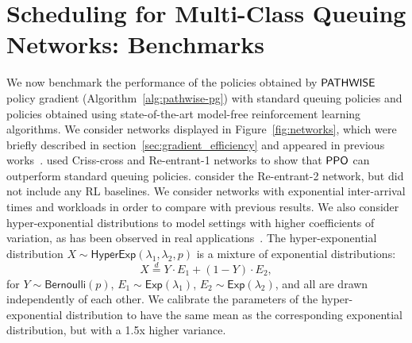 




\section{Scheduling for Multi-Class Queuing Networks: Benchmarks}
\label{section:results}


We now benchmark the performance of the policies obtained by $\mathsf{PATHWISE}$ policy gradient (Algorithm~\ref{alg:pathwise-pg}) with standard queuing policies and policies obtained using state-of-the-art model-free reinforcement learning algorithms.
We consider networks displayed in Figure~\ref{fig:networks}, which were briefly described in section~\ref{sec:gradient_efficiency} and appeared in previous works~\cite{dai2022queueing, bertsimas2014robust}. \citet{dai2022queueing} used Criss-cross and Re-entrant-1 networks to show that $\mathsf{PPO}$ can outperform standard queuing policies. \citet{bertsimas2014robust} consider the Re-entrant-2 network, but did not include any RL baselines. We consider networks with exponential inter-arrival times and workloads in order to compare with previous results. We also consider hyper-exponential distributions to model settings with higher coefficients of variation, as has been observed in real applications~\cite{green2007coping}. The hyper-exponential distribution $X\sim \mathsf{HyperExp}(\lambda_{1},\lambda_{2},p)$ is a mixture of exponential distributions:
\[
X \stackrel{d}{=} Y\cdot E_{1} + (1 - Y) \cdot E_{2},
\]
for $Y\sim\mathsf{Bernoulli}(p)$, $E_{1} \sim \mathsf{Exp}(\lambda_{1})$, $E_{2} \sim \mathsf{Exp}(\lambda_{2})$, and all are drawn independently of each other. We calibrate the parameters of the hyper-exponential distribution to have the same mean as the corresponding exponential distribution, but with a 1.5x higher variance.
